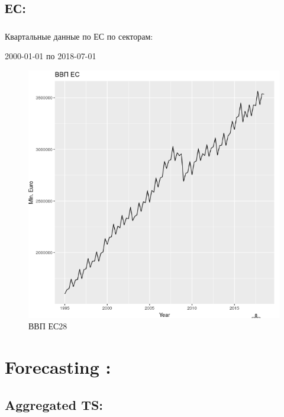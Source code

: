\documentclass[c, dvipsnames]{beamer}  %
\begin{document}
\subsection{ЕС:} 

\begin{frame}[shrink=5]
\frametitle{\insertsection} 
\framesubtitle{\insertsubsection}


Квартальные данные по ЕС по секторам: 

2000-01-01 по 2018-07-01


\begin{figure}
	\centering
	\includegraphics[width=0.7\linewidth]{screenshot021}
	\caption{ВВП ЕС28}
	\label{fig:screenshot021}
\end{figure}





\end{frame}


\section{Forecasting :} 

\subsection{Aggregated TS:} 
\end{document}
